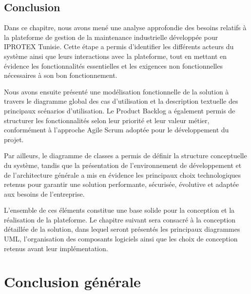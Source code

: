 \subsection{Conclusion}


Dans ce chapitre, nous avons mené une analyse approfondie des besoins relatifs à la plateforme de gestion de la maintenance industrielle développée pour IPROTEX Tunisie. Cette étape a permis d'identifier les différents acteurs du système ainsi que leurs interactions avec la plateforme, tout en mettant en évidence les fonctionnalités essentielles et les exigences non fonctionnelles nécessaires à son bon fonctionnement.

Nous avons ensuite présenté une modélisation fonctionnelle de la solution à travers le diagramme global des cas d'utilisation et la description textuelle des principaux scénarios d'utilisation. Le Product Backlog a également permis de structurer les fonctionnalités selon leur priorité et leur valeur métier, conformément à l'approche Agile Scrum adoptée pour le développement du projet.

Par ailleurs, le diagramme de classes a permis de définir la structure conceptuelle du système, tandis que la présentation de l'environnement de développement et de l'architecture générale a mis en évidence les principaux choix technologiques retenus pour garantir une solution performante, sécurisée, évolutive et adaptée aux besoins de l'entreprise.

L'ensemble de ces éléments constitue une base solide pour la conception et la réalisation de la plateforme. Le chapitre suivant sera consacré à la conception détaillée de la solution, dans lequel seront présentés les principaux diagrammes UML, l'organisation des composants logiciels ainsi que les choix de conception retenus avant leur implémentation.

\fi















\newpage

\section*{Conclusion générale}

